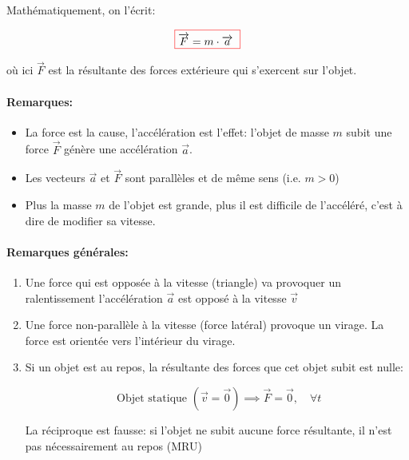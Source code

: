 \documentclass[
    11pt,
    a4paper,
    oneside,
    headinlcude, footinclude,
    twoside,
]{report}
\renewcommand{\vec}[1]{\overrightarrow{#1}}
\newcommand\Warning{
    \makebox[1.4em][c]{
    \makebox[-5.5pt][c]{\raisebox{.2em}{!}}
    \makebox[0pt][c]{\color{red}\huge$\bigtriangleup$}}
}
\newcommand{\cfbox}[2]{
    \colorlet{currentcolor}{.}
    {\color{#1}
    \fbox{\color{currentcolor}#2}}
}
\begin{document}
Mathématiquement, on l'écrit:

\begin{equation}
    \label{eq:3.1}
    \cfbox{red}{ $\vec F = m \cdot \vec a$ }
\end{equation}

où ici $\vec F$ est la résultante des forces extérieure qui s'exercent sur
l'objet.

\paragraph{Remarques:}

\begin{itemize}
    \item La force est la cause, l'accélération est l'effet: l'objet de masse
        $m$ subit une force $\vec F$ génère une accélération $\vec a$.
    \item Les vecteurs $\vec{a}$ et $\vec F$ sont parallèles et de même sens (i.e.
        $m > 0$)
    \item Plus la masse $m$ de l'objet est grande, plus il est difficile de
        l'accéléré, c'est à dire de modifier sa vitesse.
\end{itemize}

\paragraph{Remarques générales:}


\begin{enumerate}
    \item Une force qui est opposée à la vitesse (triangle) va provoquer un
        ralentissement l'accélération $\vec a$ est opposé à la vitesse $\vec v$
    \item Une force non-parallèle à la vitesse (force latéral) provoque un
        virage. La force est orientée vers l'intérieur du virage.
    \item Si un objet est au repos, la résultante des forces que cet objet
        subit est nulle:
        \begin{highlightBox}
            $$ \text{ Objet statique } (\vec v = \vec 0) \implies \vec F = \vec 0, \quad \forall t $$
        \end{highlightBox}

        \Warning La réciproque est fausse: si l'objet ne subit aucune force
        résultante, il n'est pas nécessairement au repos (MRU)
\end{enumerate}
\end{document}
